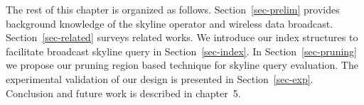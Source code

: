 The rest of this chapter is organized as follows.
Section~\ref{sec-prelim} provides background knowledge of the
skyline operator and wireless data broadcast.
Section~\ref{sec-related} surveys related works. We introduce our
index structures to facilitate broadcast skyline query in
Section~\ref{sec-index}. In Section~\ref{sec-pruning} we propose
our pruning region based technique for skyline query evaluation.
The experimental validation of our design is presented in
Section~\ref{sec-exp}. Conclusion and future work is described in chapter~5.
